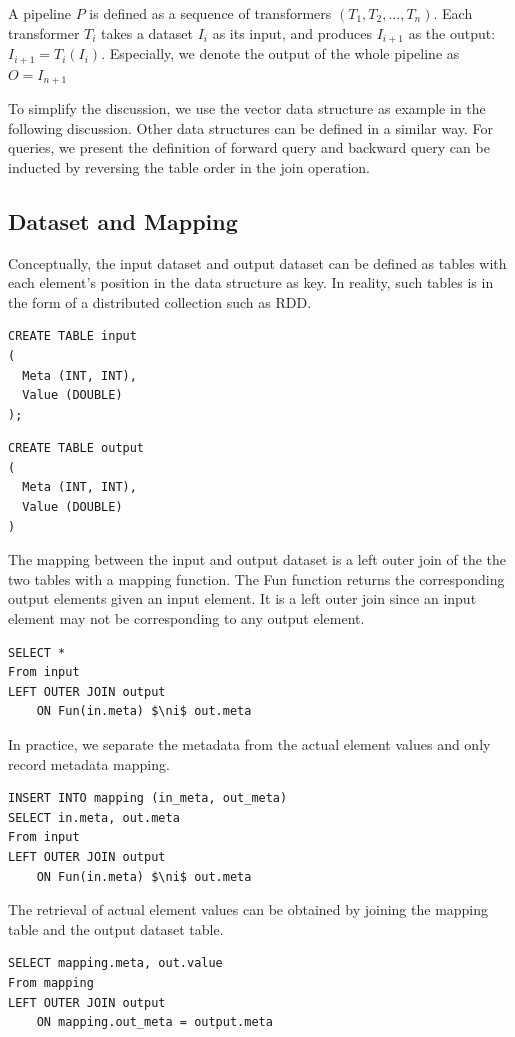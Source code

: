 \documentclass{sig-alternate}
\begin{document}
A pipeline $P$ is defined as a sequence of transformers $(T_1, T_2, ..., T_n)$. 
Each transformer $T_i$ takes a dataset $I_i$ as its input, and produces $I_{i+1}$ as the output: 
$I_{i+1} = T_i(I_i)$. 
Especially, we denote the output of the whole pipeline as $O = I_{n+1}$

To simplify the discussion, we use the vector data structure as example in the following discussion.
Other data structures can be defined in a similar way. 
For queries, we present the definition of forward query and backward query can be inducted by reversing
the table order in the join operation.

\subsection{Dataset and Mapping}
Conceptually, the input dataset and output dataset can be defined
as tables with each element's position in the data structure as key.
In reality, such tables is in the form of a distributed collection such as RDD.
\newline\newline
\noindent\begin{minipage}{\textwidth}
\noindent\begin{minipage}{.2\textwidth}
\begin{verbatim}
CREATE TABLE input
(
  Meta (INT, INT),
  Value (DOUBLE)
);
\end{verbatim}
\end{minipage} 
\qquad{\color{black}\vrule}\qquad
\begin{minipage}{.2\textwidth}
\begin{verbatim}
CREATE TABLE output
(
  Meta (INT, INT),
  Value (DOUBLE)
)
\end{verbatim}
\end{minipage}
\end{minipage}
\vspace{2ex}

The mapping between the input and output dataset is a left outer join of the the two tables with a mapping function.
The Fun function returns the corresponding output elements given an input element. 
It is a left outer join since an input element may not be corresponding to any output element.
\begin{lstlisting}
SELECT *
From input
LEFT OUTER JOIN output 
    ON Fun(in.meta) $\ni$ out.meta
\end{lstlisting}

In practice, we separate the metadata from the actual element values and only record metadata mapping.
\begin{lstlisting}
INSERT INTO mapping (in_meta, out_meta)
SELECT in.meta, out.meta
From input
LEFT OUTER JOIN output 
    ON Fun(in.meta) $\ni$ out.meta
\end{lstlisting}
The retrieval of actual element values can be obtained by joining the mapping table and the output dataset table.
\begin{lstlisting}
SELECT mapping.meta, out.value
From mapping
LEFT OUTER JOIN output 
    ON mapping.out_meta = output.meta
\end{lstlisting}
\end{document}
